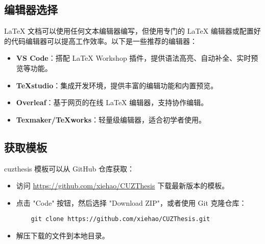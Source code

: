     \subsection{编辑器选择}\label{sub:editor-choice}

    \LaTeX{} 文档可以使用任何文本编辑器编写，但使用专门的 \LaTeX{} 编辑器或配置好的代码编辑器可以提高工作效率。以下是一些推荐的编辑器：

    \begin{itemize}
        \item \textbf{VS Code}：搭配 \LaTeX{} Workshop 插件，提供语法高亮、自动补全、实时预览等功能。
        \item \textbf{TeXstudio}：集成开发环境，提供丰富的编辑功能和内置预览。
        \item \textbf{Overleaf}：基于网页的在线 \LaTeX{} 编辑器，支持协作编辑。
        \item \textbf{Texmaker/TeXworks}：轻量级编辑器，适合初学者使用。
    \end{itemize}

    \subsection{获取模板}\label{sub:get-template}

    cuzthesis 模板可以从 GitHub 仓库获取：

    \begin{itemize}
        \item 访问 \url{https://github.com/xiehao/CUZThesis} 下载最新版本的模板。
        \item 点击 "Code" 按钮，然后选择 "Download ZIP"，或者使用 Git 克隆仓库：
        \begin{verbatim}
    git clone https://github.com/xiehao/CUZThesis.git
        \end{verbatim}
        \item 解压下载的文件到本地目录。
    \end{itemize}

